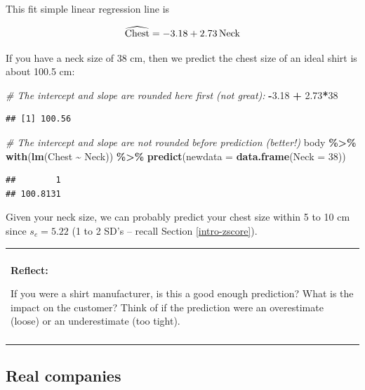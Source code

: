 \documentclass[
]{book}
\newenvironment{Shaded}{\begin{snugshade}}{\end{snugshade}}
\newcommand{\AttributeTok}[1]{\textcolor[rgb]{0.13,0.29,0.53}{#1}}
\newcommand{\CommentTok}[1]{\textcolor[rgb]{0.56,0.35,0.01}{\textit{#1}}}
\newcommand{\DecValTok}[1]{\textcolor[rgb]{0.00,0.00,0.81}{#1}}
\newcommand{\FloatTok}[1]{\textcolor[rgb]{0.00,0.00,0.81}{#1}}
\newcommand{\FunctionTok}[1]{\textcolor[rgb]{0.13,0.29,0.53}{\textbf{#1}}}
\newcommand{\NormalTok}[1]{#1}
\newcommand{\SpecialCharTok}[1]{\textcolor[rgb]{0.81,0.36,0.00}{\textbf{#1}}}
\newenvironment{reflect}
{
    \begin{center}
    
    \begin{tabular}{|p{0.8\textwidth}|}
    \rowcolor{LightBlue}
    \hline\\
    \rowcolor{LightBlue}
    \textbf{Reflect:}
}
{
    \\\rowcolor{LightBlue}
    \\\hline
    \end{tabular} 
    \end{center}
}
\begin{document}
This fit simple linear regression line is

\[ \widehat{\hbox{Chest}} = -3.18 + 2.73\,\hbox{Neck}\]

If you have a neck size of 38 cm, then we predict the chest size of an ideal shirt is about 100.5 cm:

\begin{Shaded}
\begin{Highlighting}[]
\CommentTok{\# The intercept and slope are rounded here first (not great):}
\SpecialCharTok{{-}}\FloatTok{3.18} \SpecialCharTok{+} \FloatTok{2.73}\SpecialCharTok{*}\DecValTok{38}
\end{Highlighting}
\end{Shaded}

\begin{verbatim}
## [1] 100.56
\end{verbatim}

\begin{Shaded}
\begin{Highlighting}[]
\CommentTok{\# The intercept and slope are not rounded before prediction (better!)}
\NormalTok{body }\SpecialCharTok{\%\textgreater{}\%}
    \FunctionTok{with}\NormalTok{(}\FunctionTok{lm}\NormalTok{(Chest }\SpecialCharTok{\textasciitilde{}}\NormalTok{ Neck)) }\SpecialCharTok{\%\textgreater{}\%} 
    \FunctionTok{predict}\NormalTok{(}\AttributeTok{newdata =} \FunctionTok{data.frame}\NormalTok{(}\AttributeTok{Neck =} \DecValTok{38}\NormalTok{))}
\end{Highlighting}
\end{Shaded}

\begin{verbatim}
##        1 
## 100.8131
\end{verbatim}

Given your neck size, we can probably predict your chest size within 5 to 10 cm since \(s_e = 5.22\) (1 to 2 SD's -- recall Section \ref{intro-zscore}).

\begin{reflect}
If you were a shirt manufacturer, is this a good enough prediction? What
is the impact on the customer? Think of if the prediction were an
overestimate (loose) or an underestimate (too tight).
\end{reflect}

\subsection{Real companies}\label{real-companies}
\end{document}
